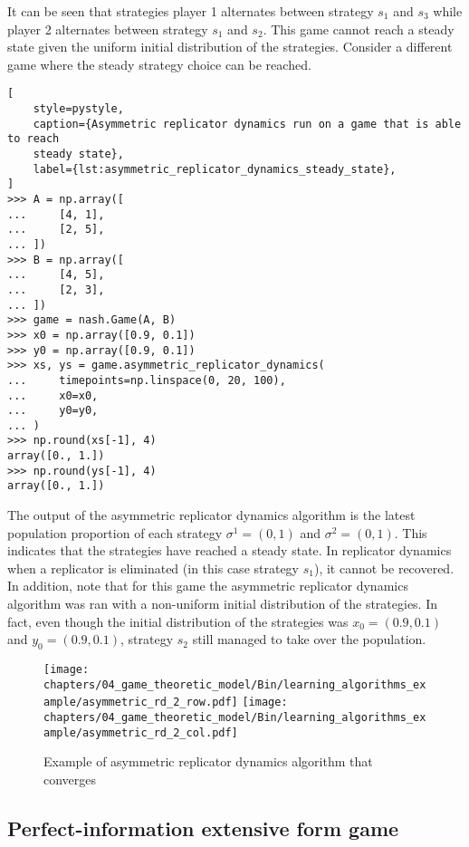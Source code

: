 It can be seen that strategies player 1 alternates between strategy \(s_1\) and
\(s_3\) while player 2 alternates between strategy \(s_1\) and \(s_2\).
This game cannot reach a steady state given the uniform initial distribution of
the strategies.
Consider a different game where the steady strategy choice can be reached.

\begin{lstlisting}[
    style=pystyle,
    caption={Asymmetric replicator dynamics run on a game that is able to reach
    steady state},
    label={lst:asymmetric_replicator_dynamics_steady_state},
]
>>> A = np.array([
...     [4, 1],
...     [2, 5],
... ])
>>> B = np.array([
...     [4, 5],
...     [2, 3],
... ])
>>> game = nash.Game(A, B)
>>> x0 = np.array([0.9, 0.1])
>>> y0 = np.array([0.9, 0.1])
>>> xs, ys = game.asymmetric_replicator_dynamics(
...     timepoints=np.linspace(0, 20, 100),
...     x0=x0,
...     y0=y0,
... )
>>> np.round(xs[-1], 4)
array([0., 1.])
>>> np.round(ys[-1], 4)
array([0., 1.])

\end{lstlisting}

The output of the asymmetric replicator dynamics algorithm is the latest
population proportion of each strategy \(\sigma^1 = (0, 1)\) and
\(\sigma^2 = (0, 1)\).
This indicates that the strategies have reached a steady state.
In replicator dynamics when a replicator is eliminated (in this case strategy
\(s_1\)), it cannot be recovered.
In addition, note that for this game the asymmetric replicator dynamics
algorithm was ran with a non-uniform initial distribution of the strategies.
In fact, even though the initial distribution of the strategies was
\(x_0 = (0.9, 0.1)\) and \(y_0 = (0.9, 0.1)\), strategy \(s_2\) still managed
to take over the population.

\begin{figure}[H]
    \centering
    \texttt{[image: chapters/04\_game\_theoretic\_model/Bin/learning\_algorithms\_example/asymmetric\_rd\_2\_row.pdf]}
    \texttt{[image: chapters/04\_game\_theoretic\_model/Bin/learning\_algorithms\_example/asymmetric\_rd\_2\_col.pdf]}
    \caption{Example of asymmetric replicator dynamics algorithm that converges}
    \label{fig:asymmetric_replicator_dynamics_steady}
\end{figure}


\subsection{Perfect-information extensive form game}


